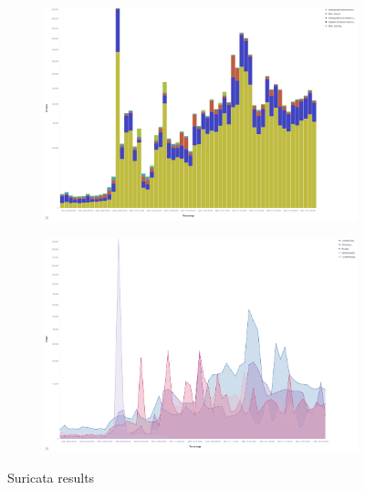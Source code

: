 \begin{figure}
    \centering

    \begin{subfigure}[b]{0.49\textwidth}
        \centering
        \includegraphics[width=\textwidth]{figures/tpot-suricata-attacks.png}
        \caption{}
        \label{fig:tpot-suricata-attacks}
    \end{subfigure}
    \hfill
    \begin{subfigure}[b]{0.49\textwidth}
        \centering
        \includegraphics[width=\textwidth]{figures/tpot-suricata-country.png}
        \caption{}
        \label{fig:tpot-suricata-country}
    \end{subfigure}
    \caption[Suricata results]{Suricata results}
    \label{fig:suricata-results}
\end{figure}

